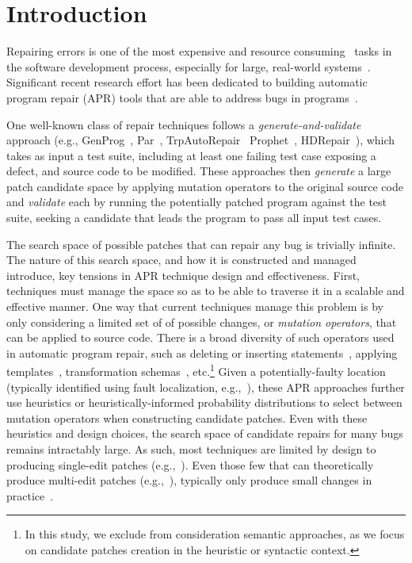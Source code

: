 \documentclass[conference]{IEEEtran}
\begin{document}
\section{Introduction} \label{introduction}
Repairing errors is one of the most expensive\cite{Tassey02,Britton13} and 
resource consuming~\cite{Weiss07} tasks in 
the software development process, especially for large, real-world systems~\cite{Liblit03,Anvik05}.
%
Significant recent research effort has been dedicated to
building automatic program repair (APR) tools that are able to address
bugs in 
programs~\cite{legoues12,kim2013,Weimer13,fan15SPR,long16proph,debroy10,perkins09,wei10}. 

One well-known class of repair techniques follows a 
\emph{generate-and-validate} approach  (e.g., GenProg~\cite{legoues12}, 
Par~\cite{kim2013}, TrpAutoRepair~\cite{Qi13TrpAutoR}
Prophet~\cite{long16proph}, HDRepair~\cite{xuan16}), which takes as input a test suite, 
including at
least one failing test case exposing
a defect, and source code to be 
modified.  These approaches then \emph{generate} a large patch candidate space 
by applying 
mutation operators to the original source code and \emph{validate} each by
running the potentially patched program against the test suite, seeking a candidate that
leads the program to pass all input test cases. 

The search space of possible patches that can repair any bug is trivially
infinite.  The nature of this search space, and how it is constructed and managed
introduce, key tensions in APR technique design and effectiveness.  First,
techniques must manage the space so as to be able to traverse it in a scalable and
effective manner.  One way that current techniques manage this problem is by
only considering a limited set of of possible changes, or \emph{mutation operators}, that can be
applied to source code.
There is a broad diversity of such operators used in automatic program repair, such as deleting or inserting 
statements~\cite{legoues12}, applying templates~\cite{kim2013}, transformation 
schemas~\cite{fan15SPR}, etc.\footnote{In this study, we exclude 
from consideration semantic approaches, as we focus on
candidate patches creation in the heuristic or syntactic context.} 
Given a potentially-faulty location (typically identified using fault
localization, e.g.,~\cite{example}), these APR  approaches further use heuristics or
heuristically-informed probability distributions to select between
mutation operators when constructing candidate patches.
Even with these heuristics and design choices, the search space of candidate
repairs for many bugs remains intractably large.  As such, most techniques are
limited by design to producing single-edit patches (e.g.,~\cite{examples}). 
Even those few that can theoretically produce multi-edit patches
(e.g.,~\cite{examples}), typically only produce small changes in
practice~\cite{reference}. 
\end{document}
